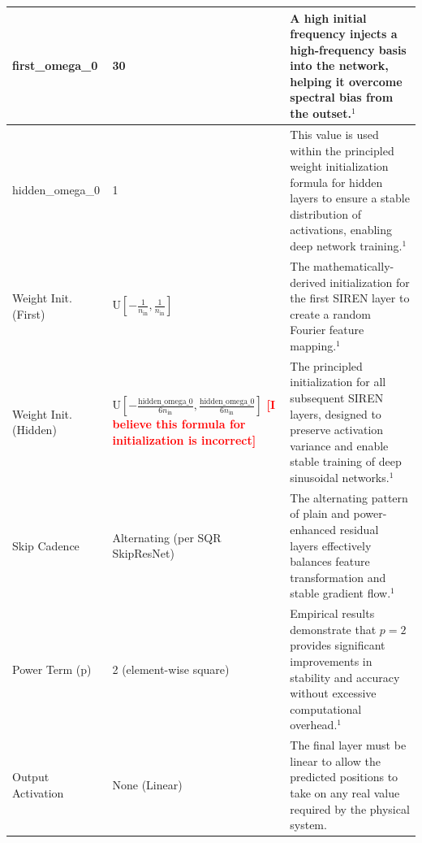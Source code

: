 \documentclass{article}
\newcommand{\authcomment}[1]{\textcolor{red}{\textbf{[#1]}}}
\begin{document}
\begin{longtable}{|p{3cm}|p{5cm}|p{8cm}|}
\hline
first\_omega\_0 & 30 & A high initial frequency injects a high-frequency basis into the network, helping it overcome spectral bias from the outset.$^1$ \\
\hline
hidden\_omega\_0 & 1 & This value is used within the principled weight initialization formula for hidden layers to ensure a stable distribution of activations, enabling deep network training.$^1$ \\
\hline
Weight Init. (First) & $\mathrm{U}\left[-\frac{1}{n_{\text{in}}}, \frac{1}{n_{\text{in}}}\right]$ & The mathematically-derived initialization for the first SIREN layer to create a random Fourier feature mapping.$^1$ \\
\hline
Weight Init. (Hidden) & $\mathrm{U}\left[-\frac{\text{hidden\_omega\_0}}{6 n_{\text{in}}}, \frac{\text{hidden\_omega\_0}}{6 n_{\text{in}}}\right]$ 
\authcomment{I believe this formula for initialization is incorrect}
& The principled initialization for all subsequent SIREN layers, designed to preserve activation variance and enable stable training of deep sinusoidal networks.$^1$ \\
\hline
Skip Cadence & Alternating (per SQR SkipResNet) & The alternating pattern of plain and power-enhanced residual layers effectively balances feature transformation and stable gradient flow.$^1$ \\
\hline
Power Term (p) & 2 (element-wise square) & Empirical results demonstrate that $p=2$ provides significant improvements in stability and accuracy without excessive computational overhead.$^1$ \\
\hline
Output Activation & None (Linear) & The final layer must be linear to allow the predicted positions to take on any real value required by the physical system. \\
\hline
\end{longtable}
\FloatBarrier





\end{document}
